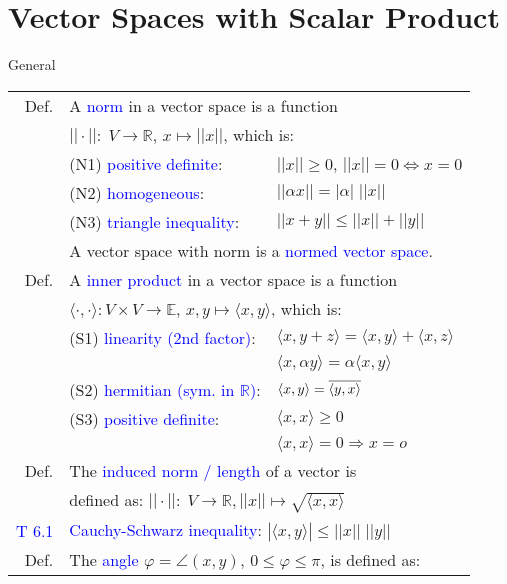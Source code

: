 \section{Vector Spaces with Scalar Product}
\begin{mainbox}{General}
\setlength{\tabcolsep}{2pt}
\begin{tabular}{rll}
	Def. & \multicolumn{2}{l}{A \textcolor{blue}{norm} in a vector space is a function}\\
	& \multicolumn{2}{l}{$||\cdot ||:\;V\rightarrow\mathbb{R}$, $x\mapsto ||x||$, which is:}\\
	& (N1) \textcolor{blue}{positive definite}: & $||x|| \ge 0$, $||x|| = 0\Leftrightarrow x = 0$\\
	& (N2) \textcolor{blue}{homogeneous}: & $||\alpha x|| = |\alpha |\;||x||$\\
	& (N3) \textcolor{blue}{triangle inequality}: & $||x+y||\leq ||x||+||y||$\\
	& \multicolumn{2}{l}{A vector space with norm is a \textcolor{blue}{normed vector space}.}\\
	\rule{0pt}{3ex}
	Def. & \multicolumn{2}{l}{A \textcolor{blue}{inner product} in a vector space is a function}\\
	& \multicolumn{2}{l}{$\langle \cdot , \cdot\rangle : V\times V\rightarrow \mathbb{E}$, $x, y \mapsto \langle x,y\rangle$, which is:}\\
	& (S1) \textcolor{blue}{linearity (2nd factor)}: & $\langle x, y + z\rangle = \langle x, y \rangle + \langle x, z \rangle$\\
	& & $\langle x, \alpha y \rangle = \alpha \langle x, y \rangle$\\
	& (S2) \textcolor{blue}{hermitian (sym. in $\mathbb{R}$)}: & $\langle x,y\rangle = \overline{\langle y,x\rangle}$\\
	& (S3) \textcolor{blue}{positive definite}: & $\langle x,x\rangle \geq 0$ \\
	& & $\langle x, x\rangle = 0\Rightarrow x = o$\\
	\rule{0pt}{3ex}
	Def. & \multicolumn{2}{l}{The \textcolor{blue}{induced norm / length} of a vector is}\\
	& \multicolumn{2}{l}{defined as: $||\cdot ||:\;V\rightarrow\mathbb{R}, ||x||\mapsto \sqrt{\langle x, x\rangle}$}\\
	\rule{0pt}{3ex}
	\textcolor{blue}{T 6.1} & \multicolumn{2}{l}{\textcolor{blue}{Cauchy-Schwarz inequality}: $|\langle x,y\rangle|\leq ||x||\;||y||$}\\
	\rule{0pt}{3ex}
	Def. & \multicolumn{2}{l}{The \textcolor{blue}{angle} $\varphi = \angle(x, y)$, $0\leq\varphi\leq\pi$, is defined as:}\\

\end{tabular}
\end{mainbox}
